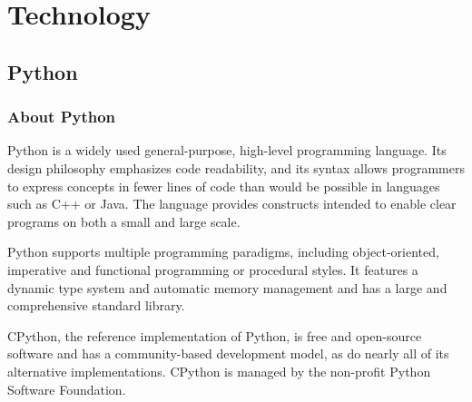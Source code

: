 \chapter{Technology}

\label{ch:technology}

\section{Python}

  \subsection{About Python}
    Python is a widely used general-purpose, high-level programming language. Its design philosophy emphasizes code readability, and its syntax allows programmers to express concepts in fewer lines of code than would be possible in languages such as C++ or Java. The language provides constructs intended to enable clear programs on both a small and large scale.
    
    Python supports multiple programming paradigms, including object-oriented, imperative and functional programming or procedural styles. It features a dynamic type system and automatic memory management and has a large and comprehensive standard library.
    
    CPython, the reference implementation of Python, is free and open-source software and has a community-based development model, as do nearly all of its alternative implementations. CPython is managed by the non-profit Python Software Foundation.
    
